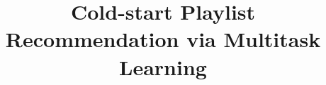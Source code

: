 \documentclass[sigconf]{acmart}
\begin{document}
\title{Cold-start Playlist Recommendation via Multitask Learning}



%
%


\begin{abstract}

\end{abstract}

\maketitle




%






\clearpage
\newpage
\onecolumn
\appendix


\end{document}
